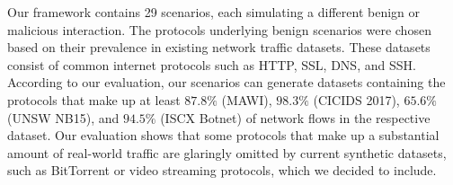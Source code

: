 \documentclass[runningheads]{llncs}
\begin{document}
Our framework contains 29 scenarios, each simulating a different benign or malicious interaction. The protocols underlying benign scenarios were chosen based on their prevalence in existing network traffic datasets. %
These datasets consist of common internet protocols such as HTTP, SSL, DNS, and SSH. According to our evaluation, our scenarios can generate datasets containing the protocols that make up at least $87.8\%$ (MAWI), $98.3\%$ (CICIDS 2017), $65.6\%$ (UNSW NB15), and $94.5\%$ (ISCX Botnet) of network flows in the respective dataset.
Our evaluation shows that some protocols that make up a substantial amount of real-world traffic are glaringly omitted by current synthetic datasets, such as BitTorrent or video streaming protocols, which we decided to include. 
\end{document}
